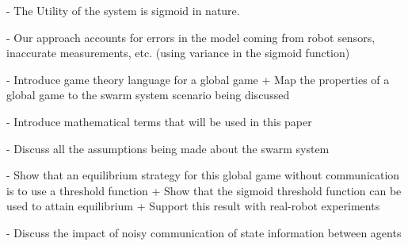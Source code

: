 \documentclass[conference]{IEEETran}
\begin{document}
- The Utility of the system is sigmoid in nature.

- Our approach accounts for errors in the model coming from robot sensors, inaccurate measurements, etc. (using variance in the sigmoid function)

- Introduce game theory language for a global game
  + Map the properties of a global game to the swarm system scenario being discussed

- Introduce mathematical terms that will be used in this paper

- Discuss all the assumptions being made about the swarm system

- Show that an equilibrium strategy for this global game without communication is to use a threshold function
  + Show that the sigmoid threshold function can be used to attain equilibrium
  + Support this result with real-robot experiments
  
- Discuss the impact of noisy communication of state information between agents  


\end{document}
